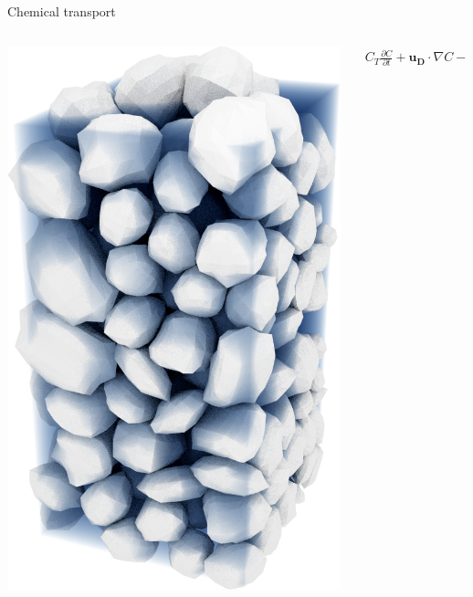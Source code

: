\documentclass{beamer}
\begin{document}
\begin{frame}{Chemical transport}
\begin{columns}
\begin{column}{0.4\textwidth}
\includegraphics[width=0.9\columnwidth]{figure/poromechwater}
\end{column}
\begin{column}{0.4\textwidth}
	\begin{align*}
 	C_T\frac{\partial C}{\partial t} +
 	\mathbf{u_D} \cdot \nabla C- D\nabla^2 T 
 	= Q_c\,.
 \end{align*}
\end{column}
\end{columns}
\end{frame}
\end{document}
